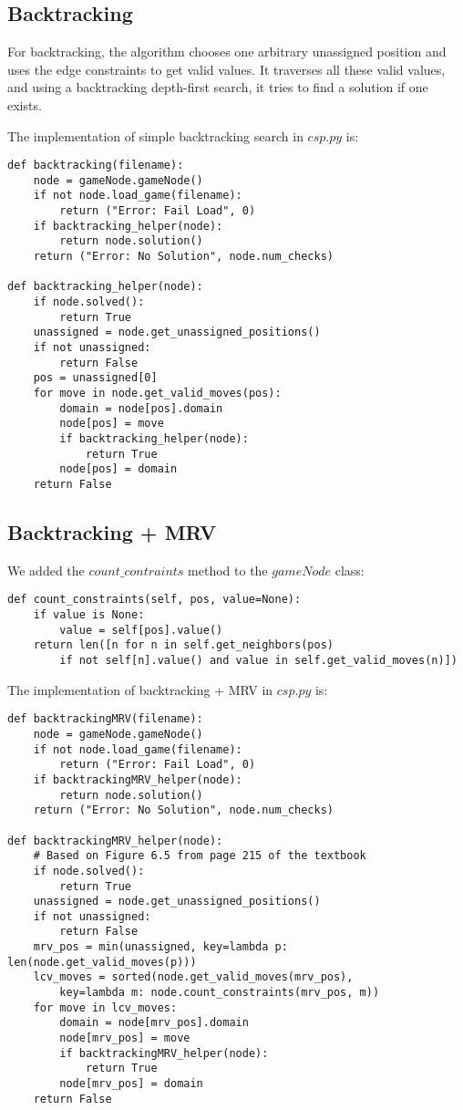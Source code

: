 \documentclass[11pt]{article}
\begin{document}
\subsection{Backtracking}

For backtracking, the algorithm chooses one arbitrary unassigned position and uses
the edge constraints to get valid values. It traverses all these valid values, and
using a backtracking depth-first search, it tries to find a solution if one exists.

The implementation of simple backtracking search in $csp.py$ is:

\lstset{language=Python}
\begin{lstlisting}[frame=single]
def backtracking(filename):
	node = gameNode.gameNode()
	if not node.load_game(filename):
		return ("Error: Fail Load", 0)
	if backtracking_helper(node):
		return node.solution()
	return ("Error: No Solution", node.num_checks)

def backtracking_helper(node):
	if node.solved():
		return True
	unassigned = node.get_unassigned_positions()
	if not unassigned:
		return False
	pos = unassigned[0]
	for move in node.get_valid_moves(pos):
		domain = node[pos].domain
		node[pos] = move
		if backtracking_helper(node):
			return True
		node[pos] = domain
	return False
\end{lstlisting}

\subsection {Backtracking + MRV}

We added the $count\_contraints$ method to the $gameNode$ class:

\lstset{language=Python}
\begin{lstlisting}[frame=single]
def count_constraints(self, pos, value=None):
	if value is None:
		value = self[pos].value()
	return len([n for n in self.get_neighbors(pos)
		if not self[n].value() and value in self.get_valid_moves(n)])
\end{lstlisting}

The implementation of backtracking + MRV in $csp.py$ is:

\lstset{language=Python}
\begin{lstlisting}[frame=single]
def backtrackingMRV(filename):
	node = gameNode.gameNode()
	if not node.load_game(filename):
		return ("Error: Fail Load", 0)
	if backtrackingMRV_helper(node):
		return node.solution()
	return ("Error: No Solution", node.num_checks)

def backtrackingMRV_helper(node):
	# Based on Figure 6.5 from page 215 of the textbook
	if node.solved():
		return True
	unassigned = node.get_unassigned_positions()
	if not unassigned:
		return False
	mrv_pos = min(unassigned, key=lambda p: len(node.get_valid_moves(p)))
	lcv_moves = sorted(node.get_valid_moves(mrv_pos),
		key=lambda m: node.count_constraints(mrv_pos, m))
	for move in lcv_moves:
		domain = node[mrv_pos].domain
		node[mrv_pos] = move
		if backtrackingMRV_helper(node):
			return True
		node[mrv_pos] = domain
	return False
\end{lstlisting}
\end{document}
